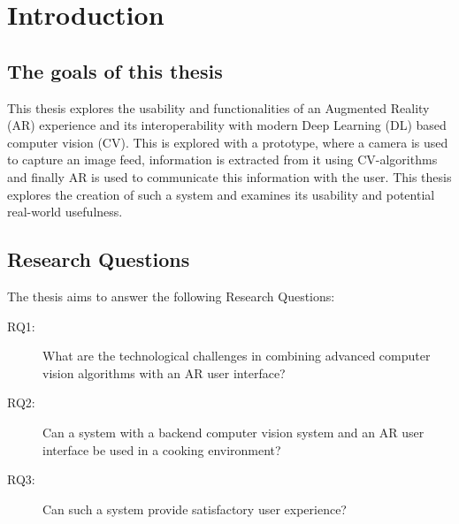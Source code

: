 \chapter{Introduction} \label{intro}

\section{The goals of this thesis} \label{goals}
This thesis explores the usability and functionalities of an Augmented Reality 
(AR) experience and its interoperability with modern Deep Learning (DL) based 
computer vision (CV). This is explored with a prototype, where a camera is 
used to capture an image feed, information is extracted from it using 
CV-algorithms and finally AR is used to communicate this information with the 
user. This thesis explores the creation of such a system and examines its 
usability and potential real-world usefulness.

\section{Research Questions} \label{rq}
The thesis aims to answer the following Research Questions:
\begin{description}
	\item[RQ1:] \label{rq1} What are the technological challenges in 
	combining advanced computer vision algorithms with an AR user interface?

	\item[RQ2:] \label{rq2} Can a system with a backend computer vision 
	system and an AR user interface be used in a cooking environment?

	\item[RQ3:] \label{rq3} Can such a system provide satisfactory user 
	experience?
\end{description}

